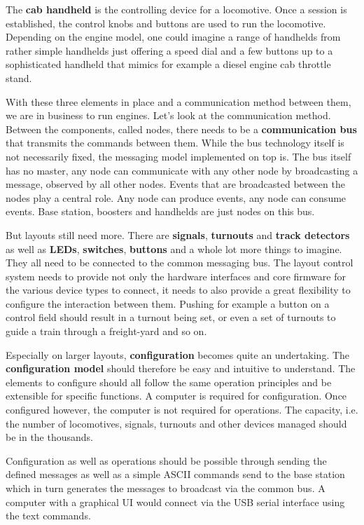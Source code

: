 The {\bf cab handheld} is the controlling device for a locomotive. Once a session is established, the control knobs and buttons are used to run the locomotive. Depending on the engine model, one could imagine a range of handhelds from rather simple handhelds just offering a speed dial and a few buttons up to a sophisticated handheld that mimics for example a diesel engine cab throttle stand.

With these three elements in place and a communication method between them, we are in business to run engines. Let's look at the communication method. Between the components, called nodes, there needs to be a {\bf communication bus} that transmits the commands between them. While the bus technology itself is not necessarily fixed, the messaging model implemented on top is. The bus itself has no master, any node can communicate with any other node by broadcasting a message, observed by all other nodes. Events that are broadcasted between the nodes play a central role. Any node can produce events, any node can consume events. Base station, boosters and handhelds are just nodes on this bus.

But layouts still need more. There are {\bf signals}, {\bf turnouts} and {\bf track detectors} as well as {\bf LEDs}, {\bf switches}, {\bf buttons} and a whole lot more things to imagine. They all need to be connected to the common messaging bus. The layout control system needs to provide not only the hardware interfaces and core firmware for the various device types to connect, it needs to also provide a great flexibility to configure the interaction between them. Pushing for example a button on a control field should result in a turnout being set, or even a set of turnouts to guide a train through a freight-yard and so on.

Especially on larger layouts, {\bf configuration} becomes quite an undertaking. The {\bf configuration model} should therefore be easy and intuitive to understand. The elements to configure should all follow the same operation principles and be extensible for specific functions. A computer is required for configuration. Once configured however, the computer is not required for operations. The capacity, i.e. the number of locomotives, signals, turnouts and other devices managed should be in the thousands.

Configuration as well as operations should be possible through sending the defined messages as well as a simple ASCII commands send to the base station which in turn generates the messages to broadcast via the common bus. A computer with a graphical UI would connect via the USB serial interface using the text commands.

